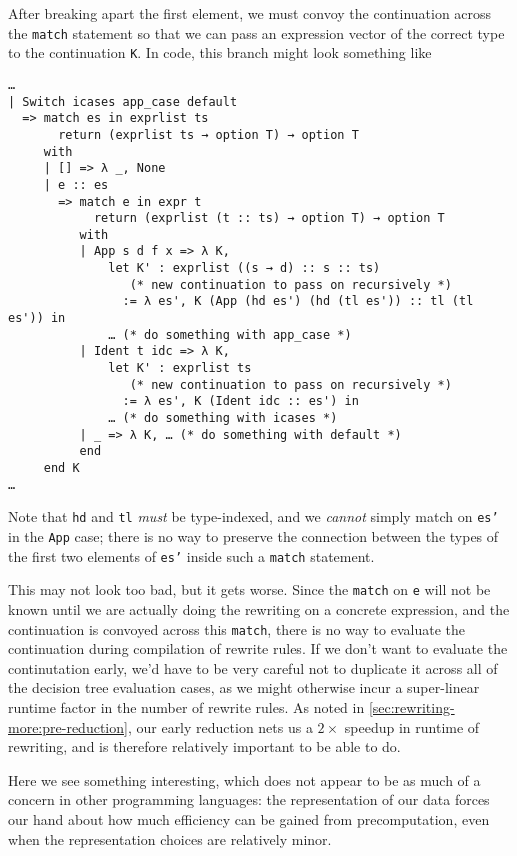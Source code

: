 After breaking apart the first element, we must convoy  the continuation across the \texttt{match} statement so that we can pass an expression vector of the correct type to the continuation \texttt{K}.
In code, this branch might look something like
\begin{verbatim}
…
| Switch icases app_case default
  => match es in exprlist ts
       return (exprlist ts → option T) → option T
     with
     | [] => λ _, None
     | e :: es
       => match e in expr t
            return (exprlist (t :: ts) → option T) → option T
          with
          | App s d f x => λ K,
              let K' : exprlist ((s → d) :: s :: ts)
                 (* new continuation to pass on recursively *)
                := λ es', K (App (hd es') (hd (tl es')) :: tl (tl es')) in
              … (* do something with app_case *)
          | Ident t idc => λ K,
              let K' : exprlist ts
                 (* new continuation to pass on recursively *)
                := λ es', K (Ident idc :: es') in
              … (* do something with icases *)
          | _ => λ K, … (* do something with default *)
          end
     end K
…
\end{verbatim}
Note that \texttt{hd} and \texttt{tl} \emph{must} be type-indexed, and we \emph{cannot} simply match on \texttt{es'} in the \texttt{App} case;
there is no way to preserve the connection between the types of the first two elements of \texttt{es'} inside such a \texttt{match} statement.

This may not look too bad, but it gets worse.
Since the \texttt{match} on \texttt{e} will not be known until we are actually doing the rewriting on a concrete expression, and the continuation is convoyed across this \texttt{match}, there is no way to evaluate the continuation during compilation of rewrite rules.
If we don't want to evaluate the continutation early, we'd have to be very careful not to duplicate it across all of the decision tree evaluation cases, as we might otherwise incur a super-linear runtime factor in the number of rewrite rules.
As noted in \autoref{sec:rewriting-more:pre-reduction}, our early reduction nets us a $2\times$ speedup in runtime of rewriting, and is therefore relatively important to be able to do.

Here we see something interesting, which does not appear to be as much of a concern in other programming languages:
the representation of our data forces our hand about how much efficiency can be gained from precomputation, even when the representation choices are relatively minor.

